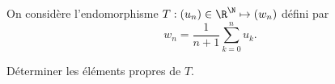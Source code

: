 \begin{enonce}
\begin{exercise}[ID={RMS135 E1423},subtitle={IMT MP 2024},tags={},difficulty={}]

On considère l’endomorphisme $T : (u_n) \in \R^{\N} \mapsto (w_n)$ défini par
\[
w_n = \frac{1}{n+1} \sum_{k=0}^{n} u_k.
\]

Déterminer les éléments propres de $T$.

\end{exercise}
\begin{solution}
\end{solution}
\end{enonce}
